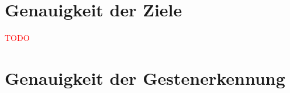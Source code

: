 



\section{Genauigkeit der Ziele}
\textcolor{red}{TODO}





\section{Genauigkeit der Gestenerkennung}


